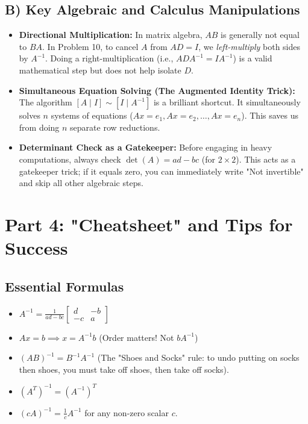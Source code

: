 \documentclass[12pt]{article}
\begin{document}
\subsection{B) Key Algebraic and Calculus Manipulations}
\begin{itemize}
    \item \textbf{Directional Multiplication:} In matrix algebra, $AB$ is generally not equal to $BA$. In Problem 10, to cancel $A$ from $AD = I$, we \textit{left-multiply} both sides by $A^{-1}$. Doing a right-multiplication (i.e., $ADA^{-1} = IA^{-1}$) is a valid mathematical step but does not help isolate $D$.
    \item \textbf{Simultaneous Equation Solving (The Augmented Identity Trick):} The algorithm $[A \mid I] \sim [I \mid A^{-1}]$ is a brilliant shortcut. It simultaneously solves $n$ systems of equations ($Ax = e_1, Ax = e_2, \dots, Ax = e_n$). This saves us from doing $n$ separate row reductions.
    \item \textbf{Determinant Check as a Gatekeeper:} Before engaging in heavy computations, always check $\det(A) = ad-bc$ (for $2 \times 2$). This acts as a gatekeeper trick; if it equals zero, you can immediately write "Not invertible" and skip all other algebraic steps.
\end{itemize}

\newpage
\section{Part 4: "Cheatsheet" and Tips for Success}

\subsection{Essential Formulas}
\begin{itemize}
    \item $A^{-1} = \frac{1}{ad-bc}\begin{bmatrix} d & -b \\ -c & a \end{bmatrix}$
    \item $Ax = b \implies x = A^{-1}b$ (Order matters! Not $b A^{-1}$)
    \item $(AB)^{-1} = B^{-1}A^{-1}$ (The "Shoes and Socks" rule: to undo putting on socks then shoes, you must take off shoes, then take off socks).
    \item $(A^T)^{-1} = (A^{-1})^T$
    \item $(cA)^{-1} = \frac{1}{c}A^{-1}$ for any non-zero scalar $c$.
\end{itemize}
\end{document}
